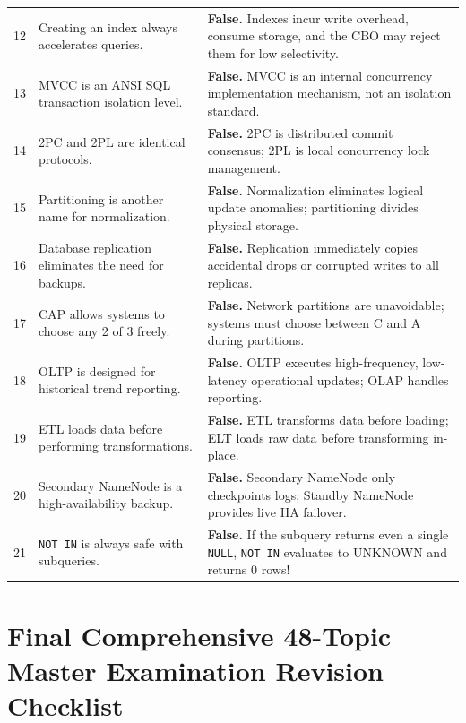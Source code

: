 \begin{table}[htbp]
\begin{tabularx}{\textwidth}{l p{4.5cm} X}
12 & Creating an index always accelerates queries. & \textbf{False.} Indexes incur write overhead, consume storage, and the CBO may reject them for low selectivity. \\
13 & MVCC is an ANSI SQL transaction isolation level. & \textbf{False.} MVCC is an internal concurrency implementation mechanism, not an isolation standard. \\
14 & 2PC and 2PL are identical protocols. & \textbf{False.} 2PC is distributed commit consensus; 2PL is local concurrency lock management. \\
15 & Partitioning is another name for normalization. & \textbf{False.} Normalization eliminates logical update anomalies; partitioning divides physical storage. \\
16 & Database replication eliminates the need for backups. & \textbf{False.} Replication immediately copies accidental drops or corrupted writes to all replicas. \\
17 & CAP allows systems to choose any 2 of 3 freely. & \textbf{False.} Network partitions are unavoidable; systems must choose between C and A during partitions. \\
18 & OLTP is designed for historical trend reporting. & \textbf{False.} OLTP executes high-frequency, low-latency operational updates; OLAP handles reporting. \\
19 & ETL loads data before performing transformations. & \textbf{False.} ETL transforms data before loading; ELT loads raw data before transforming in-place. \\
20 & Secondary NameNode is a high-availability backup. & \textbf{False.} Secondary NameNode only checkpoints logs; Standby NameNode provides live HA failover. \\
21 & \texttt{NOT IN} is always safe with subqueries. & \textbf{False.} If the subquery returns even a single \texttt{NULL}, \texttt{NOT IN} evaluates to UNKNOWN and returns 0 rows! \\
\bottomrule
\end{tabularx}
\end{table}

\section{Final Comprehensive 48-Topic Master Examination Revision Checklist}
\label{sec:dbms_master_checklist}

